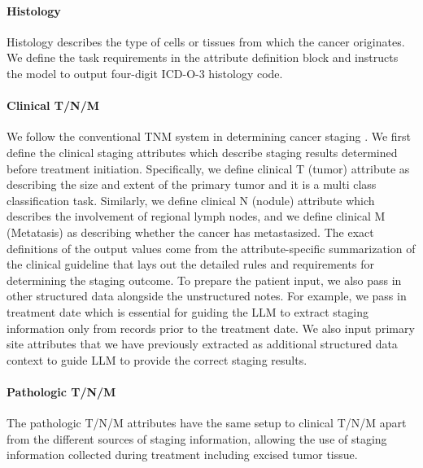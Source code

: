 \paragraph{Histology} Histology describes the type of cells or tissues from which the cancer originates. We define the task requirements in the attribute definition block and instructs the model to output four-digit ICD-O-3 histology code.

\paragraph {Clinical T/N/M} We follow the conventional TNM system in determining cancer staging \citep{rosen2023tnm}. We first define the clinical staging attributes which describe staging results determined before treatment initiation. Specifically, we define clinical T (tumor) attribute as describing the size and extent of the primary tumor and it is a multi class classification task.  Similarly, we define clinical N (nodule) attribute which describes the involvement of regional lymph nodes, and we define clinical M (Metatasis) as describing whether the cancer has metastasized. The exact definitions of the output values come from the attribute-specific summarization of the clinical guideline that lays out the detailed rules and requirements for determining the staging outcome. To prepare the patient input, we also pass in other structured data alongside the unstructured notes. For example, we pass in treatment date which is essential for guiding the \ac{LLM} to extract staging information only from records prior to the treatment date. We also input primary site attributes that we have previously extracted as additional structured data context to guide \ac{LLM} to provide the correct staging results.

\paragraph{Pathologic T/N/M} The pathologic T/N/M attributes have the same setup to clinical T/N/M apart from the different sources of staging information, allowing the use of staging information collected during treatment including excised tumor tissue.








    











































